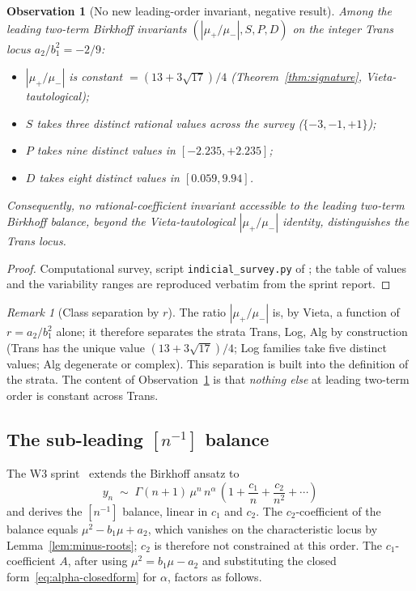 \documentclass[11pt]{amsart}
\newtheorem{observation}[theorem]{Observation}
\theoremstyle{definition}
\theoremstyle{remark}
\newtheorem{remark}[theorem]{Remark}
\begin{document}
\begin{observation}[No new leading-order invariant, negative result]
\label{prop:leading-invariant}
Among the leading two-term Birkhoff invariants
$(|\mu_+/\mu_-|, S, P, D)$ on the integer Trans locus
$a_2/b_1^2 = -2/9$:
\begin{itemize}[leftmargin=1.4em]
\item $|\mu_+/\mu_-|$ is constant $= (13+3\sqrt{17})/4$
(Theorem~\ref{thm:signature}, Vieta-tautological);
\item $S$ takes three distinct rational values across the survey
($\{-3,-1,+1\}$);
\item $P$ takes nine distinct values in $[-2.235,+2.235]$;
\item $D$ takes eight distinct values in $[0.059,9.94]$.
\end{itemize}
Consequently, no rational-coefficient invariant accessible to the
leading two-term Birkhoff balance, beyond the Vieta-tautological
$|\mu_+/\mu_-|$ identity, distinguishes the Trans locus.
\end{observation}
\begin{proof}
Computational survey, script \texttt{indicial\_survey.py} of
\cite{SprintW2Report}; the table of values and the variability ranges
are reproduced verbatim from the sprint report.
\end{proof}

\begin{remark}[Class separation by $r$]
The ratio $|\mu_+/\mu_-|$ is, by Vieta, a function of $r=a_2/b_1^2$
alone; it therefore separates the strata Trans, Log, Alg by
construction (Trans has the unique value $(13+3\sqrt{17})/4$; Log
families take five distinct values; Alg degenerate or complex).
This separation is built into the definition of the strata.  The
content of Observation~\ref{prop:leading-invariant} is that
\emph{nothing else} at leading two-term order is constant across
Trans.
\end{remark}

\subsection{The sub-leading $[n^{-1}]$ balance}\label{sec:subleading}

The W3 sprint~\cite{SprintW3Report} extends the Birkhoff ansatz to
\[
  y_n \;\sim\; \Gamma(n+1)\,\mu^n\,n^\alpha\,
  \left(1 + \frac{c_1}{n} + \frac{c_2}{n^2} + \cdots\right)
\]
and derives the $[n^{-1}]$ balance, linear in $c_1$ and $c_2$.  The
$c_2$-coefficient of the balance equals $\mu^2 - b_1\mu + a_2$, which
vanishes on the characteristic locus by Lemma~\ref{lem:minus-roots};
$c_2$ is therefore not constrained at this order.  The
$c_1$-coefficient $A$, after using $\mu^2 = b_1\mu - a_2$ and
substituting the closed form~\eqref{eq:alpha-closedform} for $\alpha$,
factors as follows.
\end{document}
